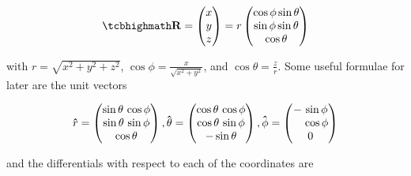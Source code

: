 \begin{equation}
	\mhl{
		\mathbf{R} =
		\begin{pmatrix}
			x \\
			y \\
			z \\
		\end{pmatrix}
		= r
		\begin{pmatrix}
			\cos{\phi}\sin{\theta} \\
			\sin{\phi}\sin{\theta} \\
			\cos{\theta}           \\
		\end{pmatrix}
	}
\end{equation}

with $r=\sqrt{x^2+y^2+z^2}$, $\cos\phi= \frac{x}{\sqrt{x^2+y^2}}$, and $\cos\theta=\frac{z}{r}$. Some useful formulae for later are the unit vectors

\begin{equation}
	\mathbf{\hat{\text{$r$}}} =
	\begin{pmatrix}
		\sin\theta \, \cos\phi \\
		\sin\theta \, \sin\phi \\
		\cos\theta             \\
	\end{pmatrix},
	\mathbf{\hat{\text{$\theta$}}} =
	\begin{pmatrix}
		\cos\theta \, \cos\phi \\
		\cos\theta \, \sin\phi \\
		- \sin\theta           \\
	\end{pmatrix},
	\mathbf{\hat{\text{$\phi$}}} =
	\begin{pmatrix}
		- \, \sin\phi            \\
		\hphantom{-} \, \cos\phi \\
		0                        \\
	\end{pmatrix}
\end{equation}

and the differentials with respect to each of the coordinates are


